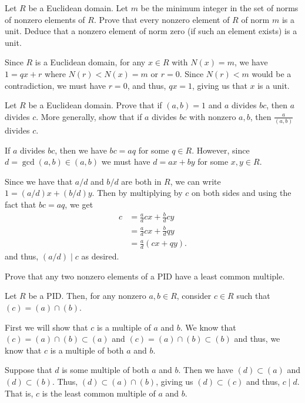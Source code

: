 \documentclass[12 pt, letterpaper]{hmcpset}
\begin{document}
\begin{problem}
	Let $R$ be a Euclidean domain. Let $m$ be the minimum integer in the set of norms of nonzero elements of $R$. Prove that every nonzero element of $R$ of norm $m$ is a unit. Deduce that a nonzero element of norm zero (if such an element exists) is a unit.
\end{problem}

\begin{solution}
	Since $R$ is a Euclidean domain, for any $x \in R$ with $N(x) = m$, we have $1 = qx + r$ where $N(r) < N(x) = m$ or $r = 0$. Since $N(r) < m$ would be a contradiction, we must have $r = 0$, and thus, $qx = 1$, giving us that $x$ is a unit.
\end{solution}

\pagebreak

\begin{problem}
	Let $R$ be a Euclidean domain. Prove that if $(a, b) = 1$ and $a$ divides $bc$, then $a$ divides $c$. More generally, show that if $a$ divides $bc$ with nonzero $a, b$, then $\frac{a}{(a, b)}$ divides $c$.
\end{problem}

\begin{solution}
	If $a$ divides $bc$, then we have $bc = a q$ for some $q \in R$. However, since $d = \gcd (a, b) \in (a, b)$ we must have $d = ax + by$ for some $x, y \in R$.
	
	Since we have that $a/d$ and $b/d$ are both in $R$, we can write $1 = (a/d)x + (b/d)y$. Then by multiplying by $c$ on both sides and using the fact that $bc = aq$, we get
	\[
		\begin{split}
			c & = \frac{a}{d} cx + \frac{b}{d} cy \\
			  & = \frac{a}{d} cx + \frac{b}{d} qy \\
			  & = \frac{a}{d} (cx + qy).
		\end{split}
	\]
	and thus, $(a/d) \mid c$ as desired.
\end{solution}

\pagebreak

\begin{problem}
	Prove that any two nonzero elements of a PID have a least common multiple.
\end{problem}

\begin{solution}
	Let $R$ be a PID. Then, for any nonzero $a, b \in R$, consider $c \in R$ such that $(c) = (a) \cap (b)$. 

	First we will show that $c$ is a multiple of $a$ and $b$. We know that $(c) = (a) \cap (b) \subset (a)$ and $(c) = (a) \cap (b) \subset (b)$ and thus, we know that $c$ is a multiple of both $a$ and $b$.

	Suppose that $d$ is some multiple of both $a$ and $b$. Then we have $(d) \subset (a)$ and $(d) \subset (b)$. Thus, $(d) \subset (a) \cap (b)$, giving us $(d) \subset (c)$ and thus, $c \mid d$. That is, $c$ is the least common multiple of $a$ and $b$.
\end{solution}
\end{document}
